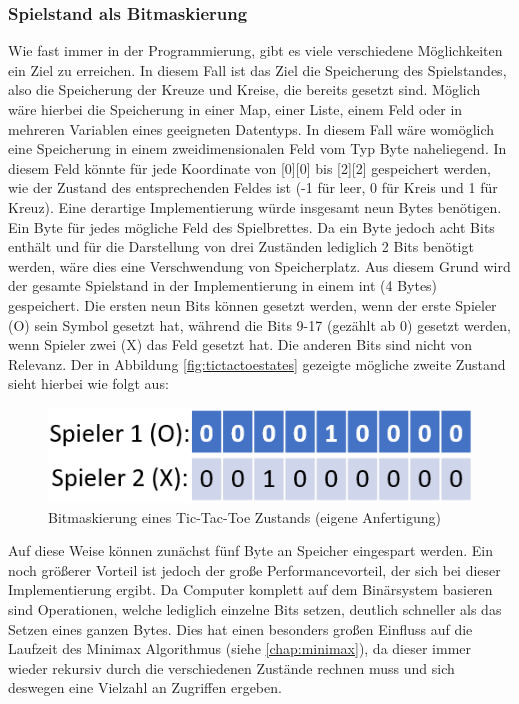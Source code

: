 \subsubsection{Spielstand als Bitmaskierung}
Wie fast immer in der Programmierung, gibt es viele verschiedene Möglichkeiten ein Ziel zu erreichen. In diesem Fall ist das Ziel die Speicherung des
Spielstandes, also die Speicherung der Kreuze und Kreise, die bereits gesetzt sind. Möglich wäre hierbei die Speicherung in einer Map, einer Liste, 
einem Feld oder in mehreren Variablen eines geeigneten Datentyps. In diesem Fall wäre womöglich eine Speicherung in einem zweidimensionalen Feld vom Typ
Byte naheliegend. In diesem Feld könnte für jede Koordinate von [0][0] bis [2][2] gespeichert werden, wie der Zustand des entsprechenden Feldes ist (-1 für
leer, 0 für Kreis und 1 für Kreuz). Eine derartige Implementierung würde insgesamt neun Bytes benötigen. Ein Byte für jedes mögliche Feld des Spielbrettes.
Da ein Byte jedoch acht Bits enthält und für die Darstellung von drei Zuständen lediglich 2 Bits benötigt werden, wäre dies eine Verschwendung von Speicherplatz.
Aus diesem Grund wird der gesamte Spielstand in der Implementierung in einem int (4 Bytes) gespeichert. Die ersten neun Bits können gesetzt werden, wenn der erste
Spieler (O) sein Symbol gesetzt hat, während die Bits 9-17 (gezählt ab 0) gesetzt werden, wenn Spieler zwei (X) das Feld gesetzt hat. Die anderen Bits sind nicht
von Relevanz. Der in Abbildung \ref{fig:tictactoestates} gezeigte mögliche zweite Zustand sieht hierbei wie folgt aus:
\begin{figure}[H]
    \centering
    \includegraphics[scale=0.45]{img/bitmaskierung.png}
    \caption[Bitmaskierung eines Tic-Tac-Toe Zustands]{Bitmaskierung eines Tic-Tac-Toe Zustands (eigene Anfertigung)}
\end{figure}
Auf diese Weise können zunächst fünf Byte an Speicher eingespart werden. Ein noch größerer Vorteil ist jedoch der große Performancevorteil, der sich bei dieser
Implementierung ergibt. Da Computer komplett auf dem Binärsystem basieren sind Operationen, welche lediglich einzelne Bits setzen, deutlich schneller als das
Setzen eines ganzen Bytes. Dies hat einen besonders großen Einfluss auf die Laufzeit des Minimax Algorithmus (siehe \ref{chap:minimax}), da dieser immer wieder
rekursiv durch die verschiedenen Zustände rechnen muss und sich deswegen eine Vielzahl an Zugriffen ergeben.


